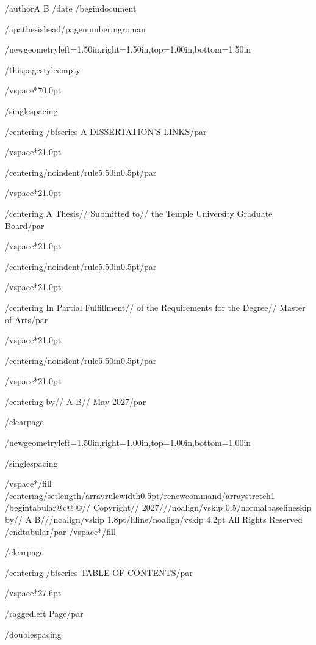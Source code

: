 /author{A B}
/date{}
/begin{document}


/apathesishead/pagenumbering{roman}

/newgeometry{left=1.50in,right=1.50in,top=1.00in,bottom=1.50in}

/thispagestyle{empty}

/vspace*{70.0pt}

/singlespacing

{/centering
/bfseries A DISSERTATION'S LINKS/par}

/vspace*{21.0pt}

{/centering/noindent/rule{5.50in}{0.5pt}/par}

/vspace*{21.0pt}

{/centering
A Thesis//
Submitted to//
the Temple University Graduate Board/par}

/vspace*{21.0pt}

{/centering/noindent/rule{5.50in}{0.5pt}/par}

/vspace*{21.0pt}

{/centering
In Partial Fulfillment//
of the Requirements for the Degree//
Master of Arts/par}

/vspace*{21.0pt}

{/centering/noindent/rule{5.50in}{0.5pt}/par}

/vspace*{21.0pt}

{/centering
by//
A B//
May 2027/par}

/clearpage

/newgeometry{left=1.50in,right=1.00in,top=1.00in,bottom=1.00in}

/singlespacing

/vspace*{/fill}
{/centering/setlength{/arrayrulewidth}{0.5pt}/renewcommand{/arraystretch}{1}
/begin{tabular}{@{}c@{}}
©//
Copyright//
2027///noalign{/vskip 0.5/normalbaselineskip}
by//
A B///noalign{/vskip 1.8pt}/hline/noalign{/vskip 4.2pt}
All Rights Reserved
/end{tabular}/par}
/vspace*{/fill}

/clearpage

{/centering
/bfseries TABLE OF CONTENTS/par}

/vspace*{27.6pt}

{/raggedleft
Page/par}

/doublespacing

